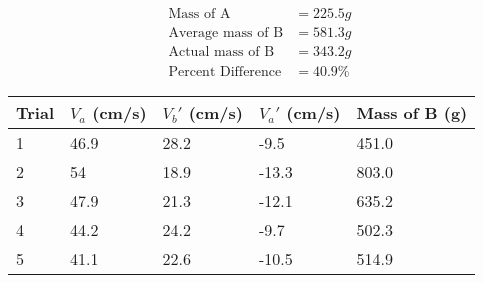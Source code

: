 \begin{equation*}
    \begin{aligned}
        \text{Mass of A}&=225.5g \\
        \text{Average mass of B}&=581.3g \\
        \text{Actual mass of B}&=343.2g \\
        \text{Percent Difference}&=40.9\%
    \end{aligned}    
\end{equation*}
\begin{table}[H]
    \begin{tabular}{|l|l|l|l|l|}
    \hline
    Trial & $V_a$ (cm/s) & $V_b'$ (cm/s) & $V_a'$ (cm/s) & Mass of B (g) \\ \hline
    1     & 46.9        & 28.2        & -9.5         & 451.0         \\ \hline
    2     & 54          & 18.9        & -13.3        & 803.0         \\ \hline
    3     & 47.9        & 21.3        & -12.1        & 635.2         \\ \hline
    4     & 44.2        & 24.2        & -9.7         & 502.3         \\ \hline
    5     & 41.1        & 22.6        & -10.5        & 514.9         \\ \hline    
    \end{tabular}
    \end{table}